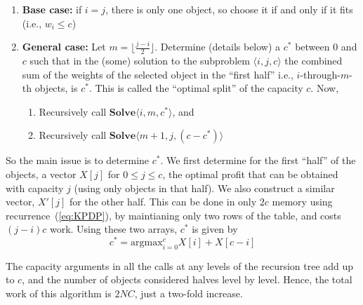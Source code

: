 \begin{enumerate}
\item \textbf{Base case:} if $i=j$, there is only one object, so choose it if
  and only if it fits (i.e., $w_i\leq c$)
\item \textbf{General case:} Let $m=\lfloor\frac{j-i}{2}\rfloor$.  Determine
  (details below) a $c^*$ between 0 and $c$ such that in the (some) solution
  to the subproblem $\langle i,j,c\rangle$ the combined sum of the weights of
  the selected object in the ``first half'' i.e., $i$-through-$m$-th objects,
  is $c^*$.  This is called the ``optimal split'' of the capacity $c$.  Now,
  \begin{enumerate}
  \item Recursively call $\mathbf{Solve} \langle i, m, c^* \rangle$, and
  \item Recursively call $\mathbf{Solve} \langle m+1, j, (c-c^*) \rangle$
  \end{enumerate}
\end{enumerate}

So the main issue is to determine $c^*$.  We first determine for the first
``half'' of the objects, a vector $X[j]$ for $0\leq j\leq c$, the optimal
profit that can be obtained with capacity $j$ (using only objects in that
half).  We also construct a similar vector, $X'[j]$ for the other half.  This
can be done in only $2c$ memory using recurrence~(\ref{eq:KPDP}), by maintianing
only two rows of the table, and costs $(j-i)c$ work.  Using these two arrays,
$c^*$ is given by
\[ c^* = \mathrm{argmax}_{i=0}^{c} X[i]+X[c-i]
\]

The capacity arguments in all the calls at any levels of the recursion tree
add up to $c$, and the number of objects considered halves level by level.
Hence, the total work of this algorithm is $2NC$, just a two-fold increase.



